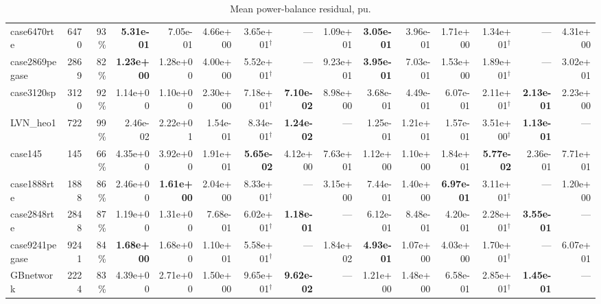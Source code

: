 \documentclass[10pt]{article}
\begin{document}
\begin{landscape}
\begin{table}[H]
\begin{tabular}{lrr rrrrrr rrrrrr}
case6470rte & 6470 & 93\% & \textbf{5.31e-01} & 7.05e-01 & 4.66e+00 & 3.65e+01$^\dagger$ & --- & 1.09e+01 & \textbf{3.05e-01} & 3.96e-01 & 1.71e+00 & 1.34e+01$^\dagger$ & --- & 4.31e+00 \\
case2869pegase & 2869 & 82\% & \textbf{1.23e+00} & 1.28e+00 & 4.00e+00 & 5.52e+01$^\dagger$ & --- & 9.23e+01 & \textbf{3.95e-01} & 7.03e-01 & 1.53e+00 & 1.89e+01$^\dagger$ & --- & 3.02e+01 \\
case3120sp & 3120 & 92\% & 1.14e+00 & 1.10e+00 & 2.30e+00 & 7.18e+01$^\dagger$ & \textbf{7.10e-02} & 8.98e+00 & 3.68e-01 & 4.49e-01 & 6.07e-01 & 2.11e+01$^\dagger$ & \textbf{2.13e-01} & 2.23e+00 \\
LVN\_heo1 & 722 & 99\% & 2.46e-02 & 2.22e+01 & 1.54e-01 & 8.34e-01$^\dagger$ & \textbf{1.24e-02} & --- & 1.25e-01 & 1.21e+01 & 1.57e-01 & 3.51e+00$^\dagger$ & \textbf{1.13e-01} & --- \\
case145 & 145 & 66\% & 4.35e+00 & 3.92e+00 & 1.91e+01 & \textbf{5.65e-02} & 4.12e+00 & 7.63e+01 & 1.12e+00 & 1.10e+00 & 1.84e+01 & \textbf{5.77e-02} & 2.36e-01 & 7.71e+01 \\
case1888rte & 1888 & 86\% & 2.46e+00 & \textbf{1.61e+00} & 2.04e+00 & 8.33e+01$^\dagger$ & --- & 3.15e+00 & 7.44e-01 & 1.40e+00 & \textbf{6.97e-01} & 3.11e+01$^\dagger$ & --- & 1.20e+00 \\
case2848rte & 2848 & 87\% & 1.19e+00 & 1.31e+00 & 7.68e-01 & 6.02e+01$^\dagger$ & \textbf{1.18e-01} & --- & 6.12e-01 & 8.48e-01 & 4.20e-01 & 2.28e+01$^\dagger$ & \textbf{3.55e-01} & --- \\
case9241pegase & 9241 & 84\% & \textbf{1.68e+00} & 1.68e+00 & 1.10e+01 & 5.58e+01$^\dagger$ & --- & 1.84e+02 & \textbf{4.93e-01} & 1.07e+00 & 4.03e+00 & 1.70e+01$^\dagger$ & --- & 6.07e+01 \\
GBnetwork & 2224 & 83\% & 4.39e+00 & 2.71e+00 & 1.50e+00 & 9.65e+01$^\dagger$ & \textbf{9.62e-02} & --- & 1.21e+00 & 1.48e+00 & 6.58e-01 & 2.85e+01$^\dagger$ & \textbf{1.45e-01} & --- \\
\bottomrule
\end{tabular}
\caption{Mean power-balance residual, pu.}
\end{table}
\end{landscape}
\end{document}
